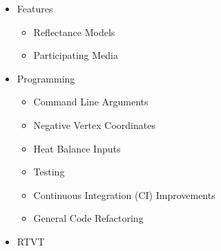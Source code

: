 \documentclass{article}
\begin{document}
\begin{itemize}
    \item Features
    \begin{itemize}
        \item Reflectance Models
        \item Participating Media
    \end{itemize}
    
    \item Programming
    \begin{itemize}
        \item Command Line Arguments
        \item Negative Vertex Coordinates
        \item Heat Balance Inputs
        \item Testing
        \item Continuous Integration (CI) Improvements
        \item General Code Refactoring
    \end{itemize}
    
    \item RTVT
\end{itemize}

\newpage
\renewcommand\bibname{References}

\end{document}
